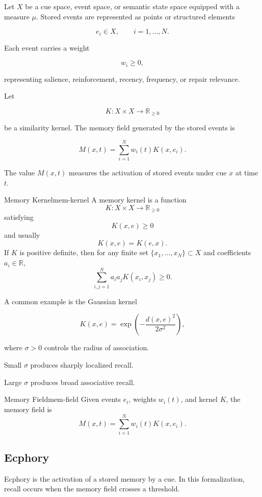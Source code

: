 \documentclass[12pt,twoside,openright]{book}
\begin{document}
Let \(X\) be a cue space, event space, or semantic state
space equipped with a measure \(\mu\). Stored events are
represented as points or structured elements

\[
e_i\in X,
\qquad
i=1,\ldots,N.
\]

Each event carries a weight

\[
w_i\ge0,
\]

representing salience, reinforcement, recency, frequency,
or repair relevance.

Let

\[
K:X\times X\rightarrow\mathbb R_{\ge0}
\]

be a similarity kernel. The memory field generated by the
stored events is

\[
M(x,t)
=
\sum_{i=1}^{N}
w_i(t)K(x,e_i).
\]

The value \(M(x,t)\) measures the activation of stored
events under cue \(x\) at time \(t\).

\begin{definition}{Memory Kernel}{mem-kernel}
  A memory kernel is a function
  \[
    K:X\times X\to\mathbb R_{\ge0}
  \]
  satisfying
  \[
    K(x,e)\ge0
  \]
  and usually
  \[
    K(x,e)=K(e,x).
  \]
  If \(K\) is positive definite, then for any finite set
  \(\{x_1,\ldots,x_N\}\subset X\) and coefficients
  \(a_i\in\mathbb R\),
  \[
    \sum_{i,j=1}^N a_i a_j K(x_i,x_j)\ge0.
  \]
\end{definition}

A common example is the Gaussian kernel

\[
K(x,e)
=
\exp
\left(
-\frac{d(x,e)^2}{2\sigma^2}
\right),
\]

where \(\sigma>0\) controls the radius of association.

Small \(\sigma\) produces sharply localized recall.

Large \(\sigma\) produces broad associative recall.

\begin{definition}{Memory Field}{mem-field}
  Given events \(e_i\), weights \(w_i(t)\), and kernel
  \(K\), the memory field is
  \[
    M(x,t)
=
    \sum_{i=1}^{N}
    w_i(t)K(x,e_i).
  \]
\end{definition}

\subsection{Ecphory}

Ecphory is the activation of a stored memory by a cue. In
this formalization, recall occurs when the memory field
crosses a threshold.
\end{document}
